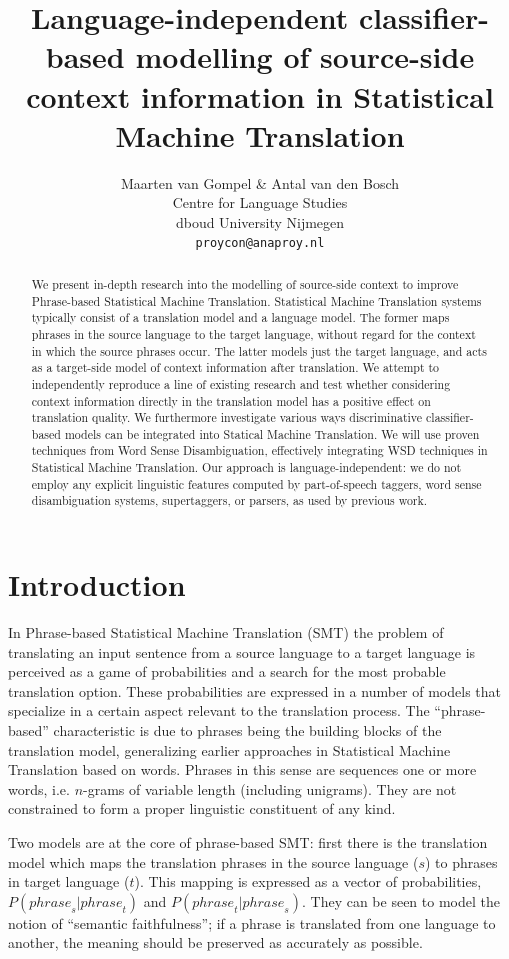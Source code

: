 \documentclass[smallextended]{svjour3}       %
\title{Language-independent classifier-based modelling of source-side context information in Statistical Machine Translation}
\author{Maarten van Gompel \& Antal van den Bosch \\
 Centre for Language Studies \\
  dboud University Nijmegen \\
  {\tt proycon@anaproy.nl}}
\theoremstyle{break}
\begin{document}
\maketitle

\begin{abstract} 
  We present in-depth research into the modelling of source-side
  context to improve Phrase-based Statistical Machine
  Translation. Statistical Machine Translation systems typically
  consist of a translation model and a language model. The former maps
  phrases in the source language to the target language, without
  regard for the context in which the source phrases occur. The latter
  models just the target language, and acts as a target-side model of
  context information after translation. We attempt to independently
  reproduce a line of existing research and test whether considering
  context information directly in the translation model has a positive
  effect on translation quality.  We furthermore investigate various
  ways discriminative classifier-based models can be integrated into
  Statical Machine Translation.  We will use proven techniques from
  Word Sense Disambiguation, effectively integrating WSD techniques in
  Statistical Machine Translation. Our approach is
  language-independent: we do not employ any explicit linguistic
  features computed by part-of-speech taggers, word sense
  disambiguation systems, supertaggers, or parsers, as used by
  previous work.
\end{abstract}

\section{Introduction}

In Phrase-based Statistical Machine Translation (SMT) the problem of
translating an input sentence from a source language to a target language is
perceived as a game of probabilities and a search for the most probable
translation option.  These probabilities are expressed in a number of models
that specialize in a certain aspect relevant to the translation process. The
``phrase-based'' characteristic is due to phrases being the building blocks of
the translation model, generalizing earlier approaches in
Statistical Machine Translation based on words.  Phrases in this
sense are sequences one or more words, i.e. $n$-grams of variable
length (including unigrams). They are not constrained to form a
proper linguistic constituent of any kind.

Two models are at the core of phrase-based SMT: first there is the
translation model which maps the translation phrases in the source
language ($s$) to phrases in target language ($t$). This mapping is
expressed as a vector of probabilities, $P({phrase}_s|{phrase}_t)$ and
$P({phrase}_t|{phrase}_s)$. They can be seen to model the notion of
``semantic faithfulness''; if a phrase is translated from one language
to another, the meaning should be preserved as accurately as possible.
\end{document}
